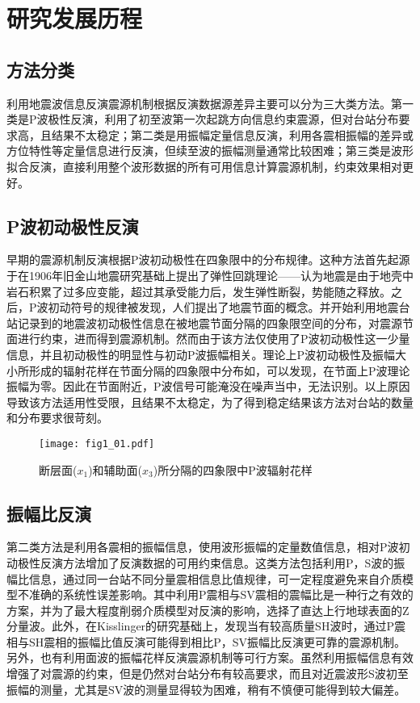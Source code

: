 \section{研究发展历程}

\subsection{方法分类}

利用地震波信息反演震源机制根据反演数据源差异主要可以分为三大类方法。第一类是P波极性反演，利用了初至波第一次起跳方向信息约束震源，但对台站分布要求高，且结果不太稳定；第二类是用振幅定量信息反演，利用各震相振幅的差异或方位特性等定量信息进行反演，但续至波的振幅测量通常比较困难；第三类是波形拟合反演，直接利用整个波形数据的所有可用信息计算震源机制，约束效果相对更好。

\subsection{P波初动极性反演}

早期的震源机制反演根据P波初动极性在四象限中的分布规律\citep{Balakina1961}。这种方法首先起源于\citet{Reid1910}在1906年旧金山地震研究\citep{Milne1910}基础上提出了弹性回跳理论——认为地震是由于地壳中岩石积累了过多应变能，超过其承受能力后，发生弹性断裂，势能随之释放。之后，P波初动符号的规律被发现\citep{Nakano1923}，人们提出了地震节面的概念。并开始利用地震台站记录到的地震波初动极性信息在被地震节面分隔的四象限空间的分布，对震源节面进行约束，进而得到震源机制。然而由于该方法仅使用了P波初动极性这一少量信息，并且初动极性的明显性与初动P波振幅相关。理论上P波初动极性及振幅大小所形成的辐射花样在节面分隔的四象限中分布如，可以发现，在节面上P波理论振幅为零。因此在节面附近，P波信号可能淹没在噪声当中，无法识别。以上原因导致该方法适用性受限，且结果不太稳定，为了得到稳定结果该方法对台站的数量和分布要求很苛刻。
\begin{figure}
\centering
  \texttt{[image: fig1\_01.pdf]} 
  \caption{断层面($x_1$)和辅助面($x_3$)所分隔的四象限中P波辐射花样\citep{Stein2003}}
  \label{fig1_01}
\end{figure}

\subsection{振幅比反演}

第二类方法是利用各震相的振幅信息，使用波形振幅的定量数值信息，相对P波初动极性反演方法增加了反演数据的可用约束信息。这类方法包括利用P，S波的振幅比信息，通过同一台站不同分量震相信息比值规律，可一定程度避免来自介质模型不准确的系统性误差影响。其中利用P震相与SV震相的震幅比\citep{Kisslinger1982,Kisslinger1980}是一种行之有效的方案，并为了最大程度削弱介质模型对反演的影响，选择了直达上行地球表面的Z分量波。此外，在Kisslinger的研究基础上，\citet{wudaming1989}发现当有较高质量SH波时，通过P震相与SH震相的振幅比值反演可能得到相比P，SV振幅比反演更可靠的震源机制。另外，也有利用面波的振幅花样\citep{Stein2003}反演震源机制等可行方案。虽然利用振幅信息有效增强了对震源的约束，但是仍然对台站分布有较高要求，而且对近震波形S波初至振幅的测量，尤其是SV波的测量显得较为困难\citep{qiyuping2013}，稍有不慎便可能得到较大偏差。

